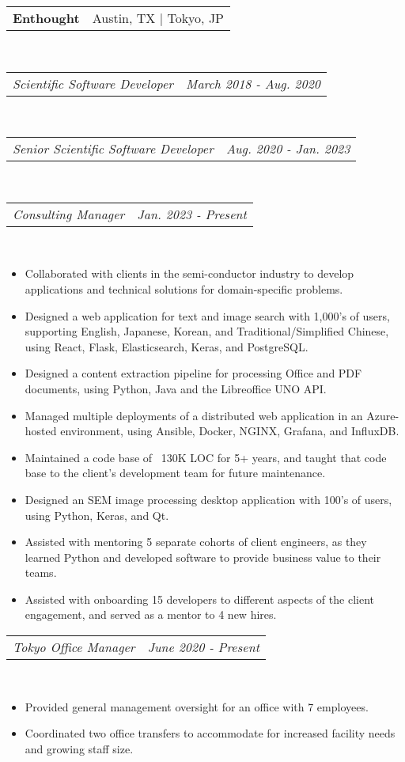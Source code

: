 \documentclass{article}
\makeatletter
\newcommand{\subheading}[2]{
	\begin{tabular*}{\textwidth}{l@{\extracolsep{\fill}}r}
		\textbf{#1} & #2 \\
	\end{tabular*} \\
}
\newcommand{\itemheading}[2]{
	\vspace{0.2em}
	\begin{tabular*}{\textwidth}{l@{\extracolsep{\fill}}r}
		\textit{#1} & \textit{#2} \\
	\end{tabular*} \\
	\vspace{-0.5em}
}
\makeatother
\begin{document}
\subheading{Enthought}{Austin, TX | Tokyo, JP}
\itemheading{Scientific Software Developer}{March 2018 - Aug. 2020}
\vspace{0.5em}
\itemheading{Senior Scientific Software Developer}{Aug. 2020 - Jan. 2023}
\vspace{0.5em}
\itemheading{Consulting Manager}{Jan. 2023 - Present}
\begin{itemize}
	\item Collaborated with clients in the semi-conductor industry to develop
	      applications and technical solutions for domain-specific problems.
	\item Designed a web application for text and image search with 1,000's of
	      users, supporting English, Japanese, Korean, and
		  Traditional/Simplified Chinese, using React, Flask, Elasticsearch,
		  Keras, and PostgreSQL.
	\item Designed a content extraction pipeline for processing Office and PDF
	      documents, using Python, Java and the Libreoffice UNO API.
	\item Managed multiple deployments of a distributed web application in an
	      Azure-hosted environment, using Ansible, Docker, NGINX, Grafana, and
		  InfluxDB.
	\item Maintained a code base of ~130K LOC for 5+ years, and taught that
	      code base to the client's development team for future maintenance.
	\item Designed an SEM image processing desktop application with 100's of
	      users, using Python, Keras, and Qt.
	\item Assisted with mentoring 5 separate cohorts of client engineers, as
		  they learned Python and developed software to provide business value
		  to their teams.
	\item Assisted with onboarding 15 developers to different aspects of the
	      client engagement, and served as a mentor to 4 new hires.
\end{itemize}
\itemheading{Tokyo Office Manager}{June 2020 - Present}
\begin{itemize}
	\item Provided general management oversight for an office with 7
		  employees.
	\item Coordinated two office transfers to accommodate for increased
		  facility needs and growing staff size.
\end{itemize}
\end{document}
